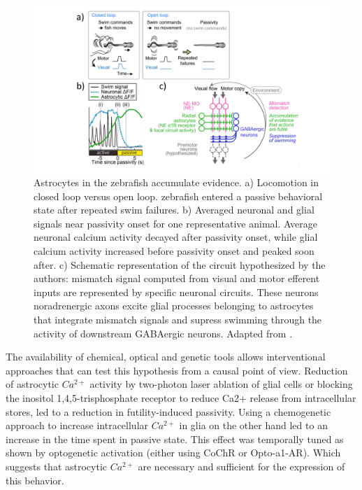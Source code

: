 \begin{figure}
    \centering
    \includegraphics[trim={140 0 100 0},clip,width=\textwidth]{Figures/Chapter1/intro_fig_astro_evidence.pdf}
    \caption{Astrocytes in the zebrafish accumulate evidence. a) Locomotion in closed loop versus open loop. zebrafish entered a passive behavioral state after repeated swim failures. b) Averaged neuronal and glial signals near passivity onset for one representative animal. Average neuronal calcium activity decayed after passivity onset, while glial calcium activity increased before passivity onset and peaked soon after. c) Schematic representation of the circuit hypothesized by the authors: mismatch signal computed from visual and motor efferent inputs are represented by specific neuronal circuits. These neurons noradrenergic axons excite glial processes belonging to astrocytes that integrate mismatch signals and supress swimming through the activity of downstream GABAergic neurons. Adapted from \cite{mu2019}.}
    \label{fig:chap1:astro_evidence}
\end{figure}
The availability of chemical, optical and genetic tools allows interventional approaches that can test this hypothesis from a causal point of view. 
Reduction of astrocytic $Ca^{2+}$ activity by two-photon laser ablation of glial cells or blocking the inositol 1,4,5-trisphosphate receptor to reduce Ca2+ release from intracellular stores, led to a reduction in  futility-induced passivity. 
Using a chemogenetic approach to increase intracellular $Ca^{2+}$ in glia on the other hand led to an increase in the time spent in passive state. 
This effect was temporally tuned as shown by optogenetic activation (either using CoChR or Opto-a1-AR). 
Which suggests that astrocytic $Ca^{2+}$ are necessary and sufficient for the expression of this behavior. 

